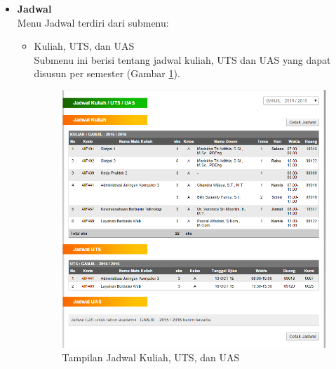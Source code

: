 \documentclass[a4paper,twoside]{article}
\begin{document}
\begin{enumerate}
\begin{enumerate}
\begin{enumerate}
\begin{itemize}
		\item \textbf{ Jadwal}\\
		Menu Jadwal terdiri dari submenu: 
		\begin{itemize}
			\item Kuliah, UTS, dan UAS \\
			Submenu ini berisi tentang jadwal kuliah, UTS dan UAS yang dapat disusun per semester (Gambar \ref{fig:3_pam_utama_jadwal}). 
			\begin{figure}[H]
				\centering
				\includegraphics[scale=0.5]{Gambar/pam-utama-jadwal}
				\caption{Tampilan Jadwal Kuliah, UTS, dan UAS} 
				\label{fig:3_pam_utama_jadwal}
			\end{figure}
			

\end{itemize}
\end{itemize}
\end{enumerate}
\end{enumerate}
\end{enumerate}
\end{document}
